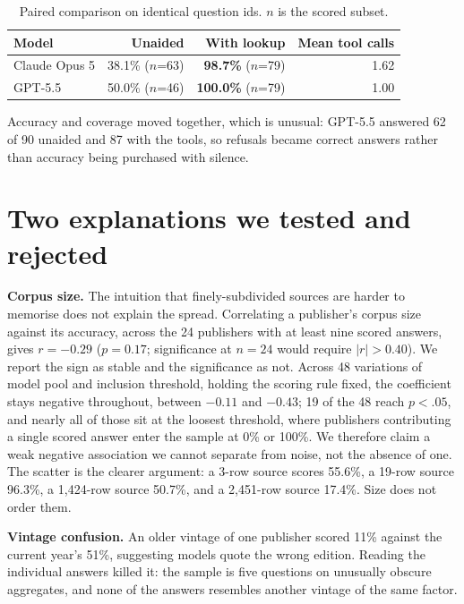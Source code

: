 \documentclass[10pt,a4paper]{article}
\begin{document}
\begin{table}[h]
\centering
\small
\setlength{\tabcolsep}{6pt}
\begin{tabular}{lrrr}
\toprule
Model & Unaided & With lookup & Mean tool calls \\
\midrule
Claude Opus 5 & 38.1\% ($n$=63) & \textbf{98.7\%} ($n$=79) & 1.62 \\
GPT-5.5       & 50.0\% ($n$=46) & \textbf{100.0\%} ($n$=79) & 1.00 \\
\bottomrule
\end{tabular}
\vspace{-0.3em}
\caption{\small Paired comparison on identical question ids. $n$ is the scored subset.}
\end{table}
\vspace{-1.2em}

Accuracy and coverage moved together, which is unusual: GPT-5.5 answered 62 of 90 unaided and 87 with the tools, so refusals became correct answers rather than accuracy being purchased with silence.

\vspace{-0.3em}
\section{Two explanations we tested and rejected}

\textbf{Corpus size.} The intuition that finely-subdivided sources are harder to memorise does not explain the spread. Correlating a publisher's corpus size against its accuracy, across the 24 publishers with at least nine scored answers, gives $r = -0.29$ ($p = 0.17$; significance at $n = 24$ would require $|r| > 0.40$). We report the sign as stable and the significance as not. Across 48 variations of model pool and inclusion threshold, holding the scoring rule fixed, the coefficient stays negative throughout, between $-0.11$ and $-0.43$; 19 of the 48 reach $p < .05$, and nearly all of those sit at the loosest threshold, where publishers contributing a single scored answer enter the sample at 0\% or 100\%. We therefore claim a weak negative association we cannot separate from noise, not the absence of one. The scatter is the clearer argument: a 3-row source scores 55.6\%, a 19-row source 96.3\%, a 1{,}424-row source 50.7\%, and a 2{,}451-row source 17.4\%. Size does not order them.

\textbf{Vintage confusion.} An older vintage of one publisher scored 11\% against the current year's 51\%, suggesting models quote the wrong edition. Reading the individual answers killed it: the sample is five questions on unusually obscure aggregates, and none of the answers resembles another vintage of the same factor.
\end{document}
